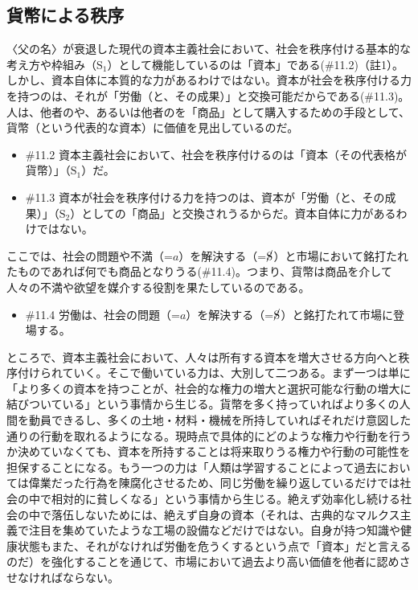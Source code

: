 \subsection{貨幣による秩序}\label{ux8ca8ux5e63ux306bux3088ux308bux79e9ux5e8f}

〈父の名〉が衰退した現代の資本主義社会において、社会を秩序付ける基本的な考え方や枠組み（\(\textrm{S}_1\)）として機能しているのは「資本」である(\#11.2)（註1）。しかし、資本自体に本質的な力があるわけではない。資本が社会を秩序付ける力を持つのは、それが「労働（と、その成果）」と交換可能だからである(\#11.3)。人は、他者のや、あるいは他者のを「商品」として購入するための手段として、貨幣（という代表的な資本）に価値を見出しているのだ。

\begin{note}{}
  \begin{itemize}
    \tightlist
    \item{\#11.2}
      資本主義社会において、社会を秩序付けるのは「資本（その代表格が貨幣）」（$\textrm{S}_1$）だ。
    \item{\#11.3}
      資本が社会を秩序付ける力を持つのは、資本が「労働（と、その成果）」（$\textrm{S}_2$）としての「商品」と交換されうるからだ。資本自体に力があるわけではない。
  \end{itemize}
\end{note}

ここでは、社会の問題や不満（=\(a\)）を解決する（=\(\cancel{\textrm{S}}\)）と市場において銘打たれたものであれば何でも商品となりうる(\#11.4)。つまり、貨幣は商品を介して人々の不満や欲望を媒介する役割を果たしているのである。

\begin{note}{}
  \begin{itemize}
    \tightlist
    \item{\#11.4}
      労働は、社会の問題（=$a$）を解決する（=$\cancel{\textrm{S}}$）と銘打たれて市場に登場する。
  \end{itemize}
\end{note}

ところで、資本主義社会において、人々は所有する資本を増大させる方向へと秩序付けられていく。そこで働いている力は、大別して二つある。まず一つは単に「より多くの資本を持つことが、社会的な権力の増大と選択可能な行動の増大に結びついている」という事情から生じる。貨幣を多く持っていればより多くの人間を動員できるし、多くの土地・材料・機械を所持していればそれだけ意図した通りの行動を取れるようになる。現時点で具体的にどのような権力や行動を行うか決めていなくても、資本を所持することは将来取りうる権力や行動の可能性を担保することになる。もう一つの力は「人類は学習することによって過去においては偉業だった行為を陳腐化させるため、同じ労働を繰り返しているだけでは社会の中で相対的に貧しくなる」という事情から生じる。絶えず効率化し続ける社会の中で落伍しないためには、絶えず自身の資本（それは、古典的なマルクス主義で注目を集めていたような工場の設備などだけではない。自身が持つ知識や健康状態もまた、それがなければ労働を危うくするという点で「資本」だと言えるのだ）を強化することを通じて、市場において過去より高い価値を他者に認めさせなければならない。

